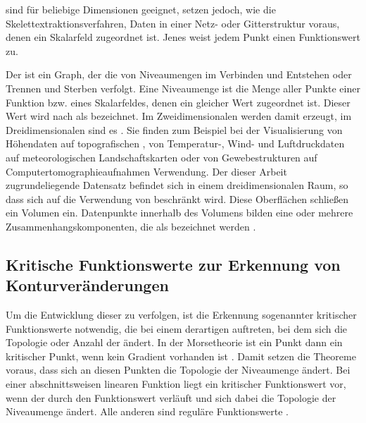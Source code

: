  sind für beliebige Dimensionen geeignet, setzen jedoch, wie die Skelettextraktionsverfahren, Daten in einer Netz- oder Gitterstruktur voraus, denen ein Skalarfeld zugeordnet ist. Jenes weist jedem Punkt einen Funktionswert zu.

Der  ist ein Graph, der die  von Niveaumengen im Verbinden und Entstehen oder Trennen und Sterben verfolgt. Eine Niveaumenge ist die Menge aller Punkte einer Funktion bzw. eines Skalarfeldes, denen ein gleicher Wert zugeordnet ist. Dieser Wert wird nach \cite[S.~1]{carr2010flexibleIsosurfaces} als  bezeichnet. Im Zweidimensionalen werden damit  erzeugt, im Dreidimensionalen sind es . Sie finden zum Beispiel bei der Visualisierung von Höhendaten auf topografischen \cite{hurni2010landform} \cite{openstreetmapContours}, von Temperatur-, Wind- und Luftdruckdaten auf meteorologischen Landschaftskarten \cite{hopkins1996weather} oder von Gewebestrukturen auf Computertomographieaufnahmen \cite{tang2014ctImages} Verwendung.
Der dieser Arbeit zugrundeliegende Datensatz befindet sich in einem dreidimensionalen Raum, so dass sich auf die Verwendung von  beschränkt wird. Diese Oberflächen schließen ein Volumen ein. Datenpunkte innerhalb des Volumens bilden eine oder mehrere Zusammenhangskomponenten, die als  bezeichnet werden \cite[S.~2]{carr2001computingCountourTrees}.

\subsection*{Kritische Funktionswerte zur Erkennung von Konturveränderungen}
Um die Entwicklung dieser  zu verfolgen, ist die Erkennung sogenannter kritischer Funktionswerte notwendig, die bei einem derartigen  auftreten, bei dem sich die Topologie oder Anzahl der  ändert. In der Morsetheorie ist ein Punkt dann ein kritischer Punkt, wenn kein Gradient vorhanden ist  \cite{milnor1963morse} \cite{shinagawa1991surfaceBasedOnMorse}. Damit setzen die Theoreme voraus, dass sich an diesen Punkten die Topologie der Niveaumenge ändert. Bei einer abschnittsweisen linearen Funktion liegt ein kritischer Funktionswert vor, wenn der  durch den Funktionswert verläuft und sich dabei die Topologie der Niveaumenge ändert. Alle anderen sind reguläre Funktionswerte \cite{carr2010flexibleIsosurfaces} \cite{chiang2005contourTreesUsingMonotonePaths}.

